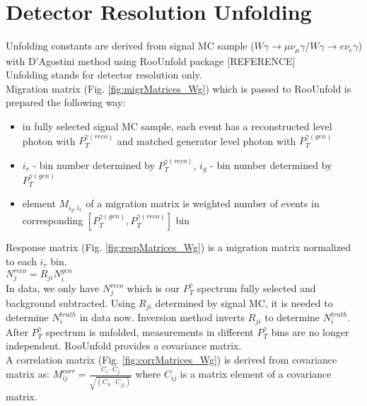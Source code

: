 \section{Detector Resolution Unfolding}
\label{sec:Unfolding}

Unfolding constants are derived from signal MC sample ($W\gamma\rightarrow\mu\nu_{\mu}\gamma$/$W\gamma\rightarrow{e}\nu_{e}\gamma$) with D'Agostini method using RooUnfold package [REFERENCE]\\

Unfolding stands for detector resolution only.\\

Migration matrix (Fig. \ref{fig:migrMatrices_Wg}) which is passed to RooUnfold is prepared the following way:
\begin{itemize}
  \item in fully selected signal MC sample, each event has a reconstructed level photon with $P_T^{\gamma(reco)}$ and matched generator level photon with $P_T^{\gamma(gen)}$
  \item $i_r$ - bin number determined by $P_T^{\gamma(reco)}$, $i_g$ - bin number determined by $P_T^{\gamma(gen)}$
  \item element $M_{i_g,i_r}$ of a migration matrix is weighted number of events in corresponding $[P_T^{\gamma(gen)},P_T^{\gamma(reco)}]$ bin
\end{itemize}

Response matrix (Fig. \ref{fig:respMatrices_Wg}) is a migration matrix normalized to each $i_r$ bin.\\
$N^{reco}_j = R_{ji} N^{gen}_i$\\

In data, we only have $N^{reco}_j$ which is our $P_T^{\gamma}$ spectrum fully selected and background subtracted. Using $R_{ji}$ determined by signal MC, it is needed to determine $N^{truth}_i$ in data now. Inversion method inverts $R_{ji}$ to determine $N^{truth}_i$.\\

After $P_T^{\gamma}$ spectrum is unfolded, measurements in different $P_T^{\gamma}$ bins are no longer independent. RooUnfold provides a covariance matrix.\\

A correlation matrix (Fig. \ref{fig:corrMatrices_Wg}) is derived from covariance matrix as:
$M^{corr}_{ij} = \frac{C_i \cdot C_j}{\sqrt{(C_{ii} \cdot C_{jj})}} $ where $C_{ij}$ is a matrix element of a covariance matrix.\\

